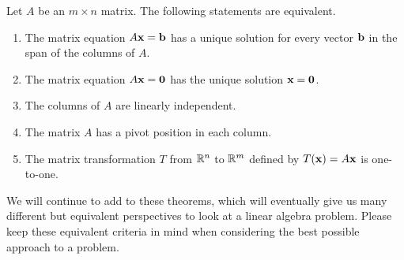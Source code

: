 \begin{theorem} \label{thm:IMT_1_g_b} Let $A$ be an $m \times n$ matrix. The following statements are equivalent.
    \begin{enumerate}
    \item The matrix equation $A \mathbf{x} = \mathbf{b}$ has a unique solution for every vector $\mathbf{b}$ in the span of the columns of $A$.
    \item The matrix equation $A \mathbf{x} = \mathbf{0}$ has the unique solution $\mathbf{x} = \mathbf{0}$.
    \item The columns of $A$ are linearly independent.
    \item The matrix $A$ has a pivot position in each column. 
    \item The matrix transformation $T$ from $\mathbb{R}^n$ to $\mathbb{R}^m$ defined by $T(\mathbf{x}) = A\mathbf{x}$ is one-to-one.
    \end{enumerate}
\end{theorem}


We will continue to add to these theorems, which will eventually give us many different but equivalent perspectives to look at a linear algebra problem. Please keep these equivalent criteria in mind when considering the best possible approach to a problem.

\label{sec:mtx_trans_exam}

\ExampleIntro

